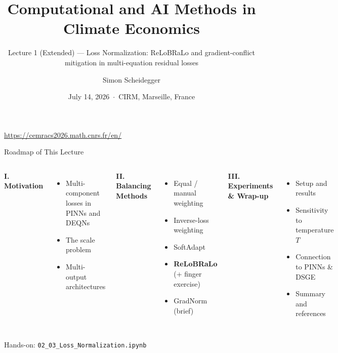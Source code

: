 \documentclass[aspectratio=169,11pt]{beamer}
\title[CEMRACS 2026 $\cdot$ Loss Normalization]
{Computational and AI Methods in Climate Economics}
\subtitle{Lecture 1 (Extended) --- Loss Normalization: ReLoBRaLo and gradient-conflict mitigation in multi-equation residual losses}
\author{Simon Scheidegger}
\institute{HEC Lausanne $\cdot$ Grantham Research Institute, LSE}
\date{July 14, 2026 \,$\cdot$\, CIRM, Marseille, France}
\begin{document}
\newcommand{\exercisepause}{%
  \tikz[baseline=(X.base)]{\node[fill=darkgreen!80!black, text=white,
  rounded corners=2pt, inner sep=3pt, font=\scriptsize\bfseries](X){PAUSE --- 5 min};}}



{
\begin{frame}
\titlepage
\vspace{-0.4cm}
\begin{center}
{\footnotesize \url{https://cemracs2026.math.cnrs.fr/en/}}
\end{center}
\end{frame}
}

\begin{frame}{Roadmap of This Lecture}
\begin{columns}[T]
\textbf{I. Motivation}
\begin{itemize}
    \item Multi-component losses in PINNs and DEQNs
    \item The scale problem
    \item Multi-output architectures
\end{itemize}

\vspace{0.4em}
\textbf{II. Balancing Methods}
\begin{itemize}
    \item Equal / manual weighting
    \item Inverse-loss weighting
    \item SoftAdapt
    \item \textbf{ReLoBRaLo} (+ finger exercise)
    \item GradNorm (brief)
\end{itemize}

\textbf{III. Experiments \& Wrap-up}
\begin{itemize}
    \item Setup and results
    \item Sensitivity to temperature $T$
    \item Connection to PINNs \& DSGE
    \item Summary and references
\end{itemize}
\end{columns}

\vspace{0.2em}
\begin{center}
{\scriptsize Hands-on: \texttt{02\_03\_Loss\_Normalization.ipynb}}
\end{center}
\end{frame}
\end{document}
